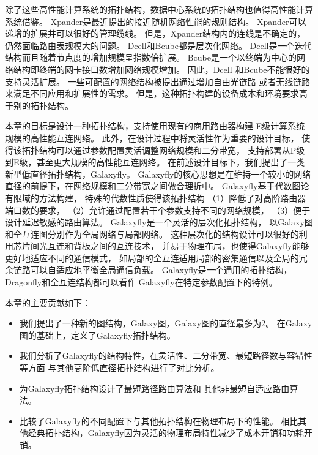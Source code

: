 除了这些高性能计算系统的拓扑结构，数据中心系统的拓扑结构也值得高性能计算系统借鉴。
Xpander是最近提出的接近随机网络性能的规则结构。
Xpander可以递增的扩展并可以很好的管理缆线。
但是，Xpander结构内的连线是不确定的，
仍然面临路由表规模大的问题。
Dcell和Bcube都是层次化网络。
Dcell是一个迭代结构而且随着节点度的增加规模呈指数倍扩展。
Bcube是一个以终端为中心的网络结构即终端的网卡接口数增加网络规模增加。
因此，Dcell 和Bcube不能很好的支持灵活扩展。
一些可配置的网络结构被提出通过增加自由光链路
或者无线链路来满足不同应用和扩展性的需求。
但是，这种拓扑构建的设备成本和环境要求高于别的拓扑结构。

本章的目标是设计一种拓扑结构，支持使用现有的商用路由器构建
E级计算系统规模的高性能互连网络。
此外，在设计过程中将灵活性作为重要的设计目标，
使得该拓扑结构可以通过参数配置灵活调整网络规模和二分带宽，
支持部署从P级到E级，甚至更大规模的高性能互连网络。
在前述设计目标下，我们提出了一类新型低直径拓扑结构，Galaxyfly。
Galaxyfly的核心思想是在维持一个较小的网络直径的前提下，在网络规模和二分带宽之间做合理折中。
Galaxyfly基于代数图论有限域的方法构建，
特殊的代数性质使得该拓扑结构
（1）降低了对高阶路由器端口数的要求，
（2）允许通过配置若干个参数支持不同的网络规模，
（3）便于设计延迟敏感的路由算法。
Galaxyfly是一个灵活的层次化拓扑结构，
以Galaxy图和全互连图分别作为全局网络与局部网络。
这种层次化的结构设计可以很好的利用芯片间光互连和背板之间的互连技术，
并易于物理布局，也使得Galaxyfly能够更好地适应不同的通信模式，
如局部的全互连适用局部的密集通信以及全局的冗余链路可以自适应地平衡全局通信负载。
Galaxyfly是一个通用的拓扑结构，Dragonfly和全互连结构都可以看作
Galaxyfly在特定参数配置下的特例。

本章的主要贡献如下：

\begin{itemize}
\item 我们提出了一种新的图结构，Galaxy图，Galaxy图的直径最多为2。
  在Galaxy图的基础上，定义了Galaxyfly拓扑结构。
\item 我们分析了Galaxyfly的结构特性，在灵活性、二分带宽、最短路径数与容错性等方面
  与其他高阶低直径拓扑结构进行了对比分析。
\item 为Galaxyfly拓扑结构设计了最短路径路由算法和
  其他非最短自适应路由算法。
\item 比较了Galaxyfly的不同配置下与其他拓扑结构在物理布局下的性能。
  相比其他经典拓扑结构，Galaxyfly因为灵活的物理布局特性减少了成本开销和功耗开销。
\end{itemize}

